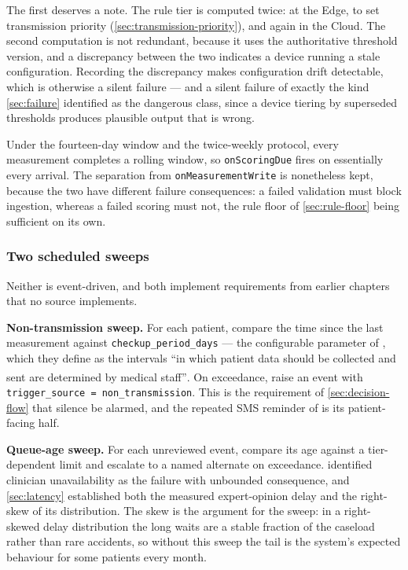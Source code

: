 \documentclass[12pt,a4paper,oneside]{report}
\newcommand{\bq}[1]{``#1''\textsuperscript{\dag}}
\begin{document}
The first deserves a note. The rule tier is computed twice: at the Edge, to set transmission priority (\cref{sec:transmission-priority}), and again in the Cloud. The second computation is not redundant, because it uses the authoritative threshold version, and a discrepancy between the two indicates a device running a stale configuration. Recording the discrepancy makes configuration drift detectable, which is otherwise a silent failure --- and a silent failure of exactly the kind \cref{sec:failure} identified as the dangerous class, since a device tiering by superseded thresholds produces plausible output that is wrong.

Under the fourteen-day window and the twice-weekly protocol, every measurement completes a rolling window, so \texttt{onScoringDue} fires on essentially every arrival. The separation from \texttt{onMeasurementWrite} is nonetheless kept, because the two have different failure consequences: a failed validation must block ingestion, whereas a failed scoring must not, the rule floor of \cref{sec:rule-floor} being sufficient on its own.

\subsubsection{Two scheduled sweeps}\label{sec:sweeps}

Neither is event-driven, and both implement requirements from earlier chapters that no source implements.

\textbf{Non-transmission sweep.} For each patient, compare the time since the last measurement against \texttt{checkup\_period\_days} --- the configurable parameter of \textcite{yazdani2018}, which they define as the intervals \bq{in which patient data should be collected and sent are determined by medical staff}. On exceedance, raise an event with \texttt{trigger\_source = non\_transmission}. This is the requirement of \cref{sec:decision-flow} that silence be alarmed, and the repeated SMS reminder of \textcite{yazdani2018} is its patient-facing half.

\textbf{Queue-age sweep.} For each unreviewed event, compare its age against a tier-dependent limit and escalate to a named alternate on exceedance.  identified clinician unavailability as the failure with unbounded consequence, and \cref{sec:latency} established both the measured expert-opinion delay and the right-skew of its distribution. The skew is the argument for the sweep: in a right-skewed delay distribution the long waits are a stable fraction of the caseload rather than rare accidents, so without this sweep the tail is the system's expected behaviour for some patients every month.
\end{document}
